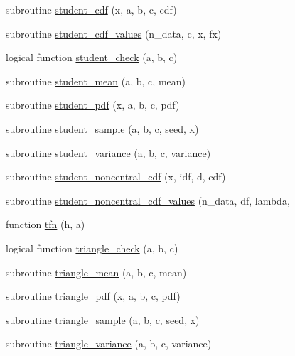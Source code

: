 \begin{DoxyCompactItemize}
\item 
subroutine \hyperlink{_bhabha__fortran__sem__doxy_8f_a4b8711966343cd70dc9ead18b8252ad1}{student\+\_\+cdf} (x, a, b, c, cdf)
\item 
subroutine \hyperlink{_bhabha__fortran__sem__doxy_8f_a20e37e60ef6e1d53450d1096d6179ae2}{student\+\_\+cdf\+\_\+values} (n\+\_\+data, c, x, fx)
\item 
logical function \hyperlink{_bhabha__fortran__sem__doxy_8f_a33e0ec77dcaf5ed332a05ab10b34af0c}{student\+\_\+check} (a, b, c)
\item 
subroutine \hyperlink{_bhabha__fortran__sem__doxy_8f_adef794feac6716fffa86207bf008f854}{student\+\_\+mean} (a, b, c, mean)
\item 
subroutine \hyperlink{_bhabha__fortran__sem__doxy_8f_ad0cdf2c699e02784d889de817e73db3a}{student\+\_\+pdf} (x, a, b, c, pdf)
\item 
subroutine \hyperlink{_bhabha__fortran__sem__doxy_8f_a704ccb9e1dc4d1755ebb37a50d5687de}{student\+\_\+sample} (a, b, c, seed, x)
\item 
subroutine \hyperlink{_bhabha__fortran__sem__doxy_8f_a5fda95cb2ebc1ee3712f6b0d07243c22}{student\+\_\+variance} (a, b, c, variance)
\item 
subroutine \hyperlink{_bhabha__fortran__sem__doxy_8f_a4e75238f2d952890a3b1999e87d07d77}{student\+\_\+noncentral\+\_\+cdf} (x, idf, d, cdf)
\item 
subroutine \hyperlink{_bhabha__fortran__sem__doxy_8f_a7af277756a7246db9ab5286f0a03010a}{student\+\_\+noncentral\+\_\+cdf\+\_\+values} (n\+\_\+data, df, lambda,
\item 
function \hyperlink{_bhabha__fortran__sem__doxy_8f_ab24bd8b58c02c63b5053a52f6fdb8be6}{tfn} (h, a)
\item 
logical function \hyperlink{_bhabha__fortran__sem__doxy_8f_ac17f060df4ddff505ffdf4fd42f83da3}{triangle\+\_\+check} (a, b, c)
\item 
subroutine \hyperlink{_bhabha__fortran__sem__doxy_8f_a3220ee5b701d76c400b43ab093c03f16}{triangle\+\_\+mean} (a, b, c, mean)
\item 
subroutine \hyperlink{_bhabha__fortran__sem__doxy_8f_aae66d0c6853e05e39d4730371449a711}{triangle\+\_\+pdf} (x, a, b, c, pdf)
\item 
subroutine \hyperlink{_bhabha__fortran__sem__doxy_8f_ad37277b4efa293c44cc27fc4bd981e8f}{triangle\+\_\+sample} (a, b, c, seed, x)
\item 
subroutine \hyperlink{_bhabha__fortran__sem__doxy_8f_abc70f31d109699c1245a87ebc99a5736}{triangle\+\_\+variance} (a, b, c, variance)

\end{DoxyCompactItemize}
